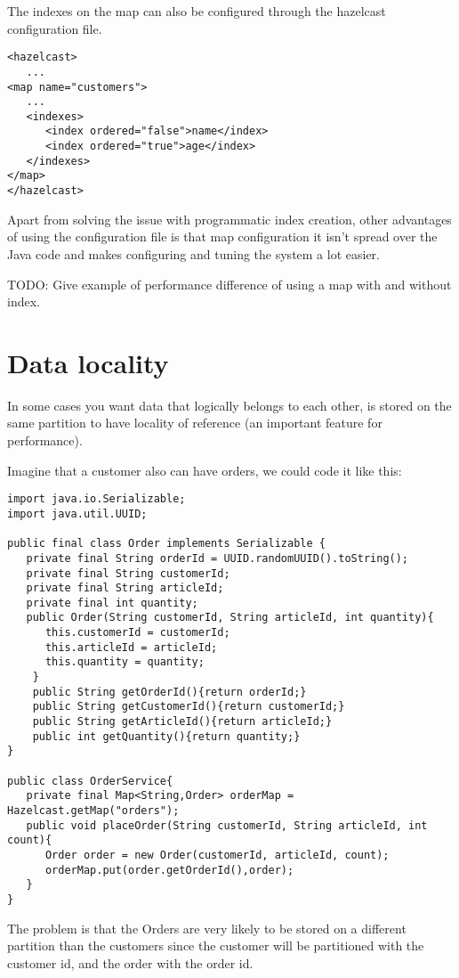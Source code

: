 The indexes on the map can also be configured through the hazelcast configuration file. 

\begin{verbatim}
<hazelcast>
   ...
<map name="customers">
   ...
   <indexes>
      <index ordered="false">name</index>
      <index ordered="true">age</index>
   </indexes>
</map>
</hazelcast>
\end{verbatim}

Apart from solving the issue with programmatic index creation, other advantages of using the configuration file is that map configuration it isn't spread over the Java code and makes configuring and tuning the system a lot easier.

TODO: Give example of performance difference of using a map with and without index.

\section{Data locality}

In some cases you want data that logically belongs to each other, is stored on the same partition to have locality of reference (an important feature for performance). 

Imagine that a customer also can have orders, we could code it like this:

\begin{verbatim}
import java.io.Serializable;
import java.util.UUID;

public final class Order implements Serializable {
   private final String orderId = UUID.randomUUID().toString();
   private final String customerId;
   private final String articleId;
   private final int quantity;
   public Order(String customerId, String articleId, int quantity){
      this.customerId = customerId;
      this.articleId = articleId;
      this.quantity = quantity;
    }
    public String getOrderId(){return orderId;}
    public String getCustomerId(){return customerId;}
    public String getArticleId(){return articleId;}
    public int getQuantity(){return quantity;}
}

public class OrderService{
   private final Map<String,Order> orderMap = Hazelcast.getMap("orders");
   public void placeOrder(String customerId, String articleId, int count){
      Order order = new Order(customerId, articleId, count);
      orderMap.put(order.getOrderId(),order);
   }
}
\end{verbatim}

The problem is that the Orders are very likely to be stored on a different partition than the customers since the customer will be partitioned with the customer id, and the order with the order id. 

